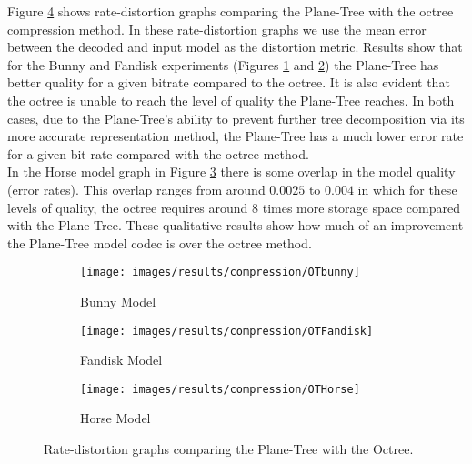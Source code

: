 Figure \ref{fig:OTEXPS} shows rate-distortion graphs comparing the Plane-Tree with the octree compression method. In these rate-distortion graphs we use the mean error between the decoded and input model as the distortion metric. Results show that for the Bunny and Fandisk experiments (Figures \ref{fig:OG_BUNNY} and \ref{fig:OG_FANDISK}) the Plane-Tree has better quality for a given bitrate compared to the octree. It is also evident that the octree is unable to reach the level of quality the Plane-Tree reaches. In both cases, due to the Plane-Tree's ability to prevent further tree decomposition via its more accurate representation method, the Plane-Tree has a much lower error rate for a given bit-rate compared with the octree method. \\

In the Horse model graph in Figure \ref{fig:OG_HORSE} there is some overlap in the model quality (error rates). This overlap ranges from around $0.0025$ to $0.004$ in which for these levels of quality, the octree requires around 8 times more storage space compared with the Plane-Tree. These qualitative results show how much of an improvement the Plane-Tree model codec is over the octree method. \\

\begin{figure}[!htb] 
        \centering
        \begin{subfigure}[b]{2.8in}
                \texttt{[image: images/results/compression/OTbunny]}
                \caption{Bunny Model}
                \label{fig:OG_BUNNY}
        \end{subfigure}%
        \begin{subfigure}[b]{2.8in}
                \texttt{[image: images/results/compression/OTFandisk]}
                \caption{Fandisk Model}
                \label{fig:OG_FANDISK}
        \end{subfigure}
        
        \begin{subfigure}[b]{2.8in}
                \texttt{[image: images/results/compression/OTHorse]}
                \caption{Horse Model}
                \label{fig:OG_HORSE}
        \end{subfigure}%

       \caption{Rate-distortion graphs comparing the Plane-Tree with the Octree.}
       \label{fig:OTEXPS}
\end{figure}